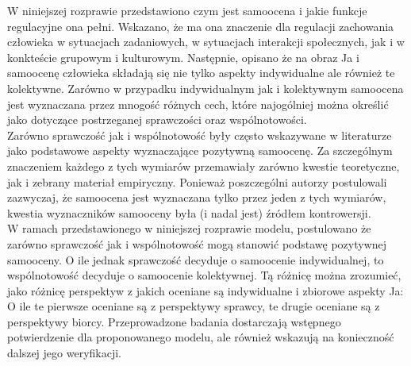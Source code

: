 \documentclass[man]{apa6}
\begin{document}
W niniejszej rozprawie przedstawiono czym jest samoocena i jakie funkcje regulacyjne ona pełni. Wskazano, że ma ona znaczenie dla regulacji zachowania człowieka w sytuacjach zadaniowych, w sytuacjach interakcji społecznych, jak i w konkteście grupowym i kulturowym. Następnie, opisano że na obraz Ja i samoocenę człowieka składają się nie tylko aspekty indywidualne ale również te kolektywne. Zarówno w przypadku indywidualnym jak i kolektywnym samoocena jest wyznaczana przez mnogość różnych cech, które najogólniej można określić jako dotyczące postrzeganej sprawczości oraz wspólnotowości.\\

Zarówno sprawczość jak i wspólnotowość były często wskazywane w literaturze jako podstawowe aspekty wyznaczające pozytywną samoocenę. Za szczególnym znaczeniem każdego z tych wymiarów przemawiały zarówno kwestie teoretyczne, jak i zebrany materiał empiryczny. Ponieważ poszczególni autorzy postulowali zazwyczaj, że samoocena jest wyznaczana tylko przez jeden z tych wymiarów, kwestia wyznaczników samooceny była (i nadal jest) źródłem kontrowersji.\\

W ramach przedstawionego w niniejszej rozprawie modelu, postulowano że zarówno sprawczość jak i wspólnotowość mogą stanowić podstawę pozytywnej samooceny. O ile jednak sprawczość decyduje o samoocenie indywidualnej, to wspólnotowość decyduje o samoocenie kolektywnej. Tą różnicę można zrozumieć, jako różnicę perspektyw z jakich oceniane są indywidualne i zbiorowe aspekty Ja: O ile te pierwsze oceniane są z perspektywy sprawcy, te drugie oceniane są z perspektywy biorcy. Przeprowadzone badania dostarczają wstępnego potwierdzenie dla proponowanego modelu, ale również wskazują na konieczność dalszej jego weryfikacji.\\



\printbibliography
\end{document}
